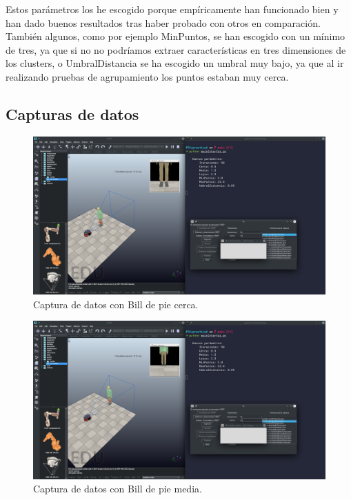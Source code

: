 \documentclass[12pt, spanish]{article}
\begin{document}
Estos parámetros los he escogido porque empíricamente han funcionado bien y han dado buenos resultados tras haber probado con otros en comparación. También algunos, como por ejemplo MinPuntos, se han escogido con un mínimo de tres, ya que si no no podríamos extraer características en tres dimensiones de los clusters, o UmbralDistancia se ha escogido un umbral muy bajo, ya que al ir realizando pruebas de agrupamiento los puntos estaban muy cerca.

\subsection{Capturas de datos}

\begin{figure}[H]
    \centering
    \includegraphics[width=\textwidth]{captura_datos.png}
    \caption{Captura de datos con Bill de pie cerca.}
\end{figure}

\begin{figure}[H]
    \centering
    \includegraphics[width=\textwidth]{captura_media.png}
    \caption{Captura de datos con Bill de pie media.}
\end{figure}
\end{document}
